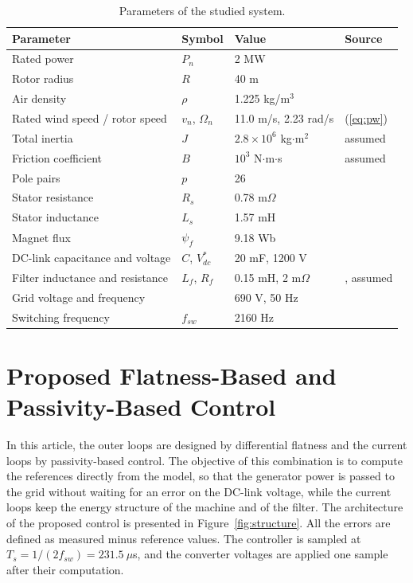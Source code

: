 \documentclass[11pt,a4paper]{article}
\begin{document}
\begin{table}[!htb]
\caption{Parameters of the studied system.}
\label{tab:param}
\centering
\begin{tabular}{llll}
\toprule
Parameter & Symbol & Value & Source\\
\midrule
Rated power & $P_n$ & 2 MW & \cite{hasan2021}\\
Rotor radius & $R$ & 40 m & \cite{rolan2009}\\
Air density & $\rho$ & 1.225 kg/m$^3$ & \cite{aimene2022}\\
Rated wind speed / rotor speed & $v_n$, $\Omega_n$ & 11.0 m/s, 2.23 rad/s & (\ref{eq:pw})\\
Total inertia & $J$ & $2.8\times10^6$ kg$\cdot$m$^2$ & assumed\\
Friction coefficient & $B$ & $10^3$ N$\cdot$m$\cdot$s & assumed\\
Pole pairs & $p$ & 26 & \cite{hasan2021}\\
Stator resistance & $R_s$ & 0.78 m$\Omega$ & \cite{hasan2021}\\
Stator inductance & $L_s$ & 1.57 mH & \cite{hasan2021}\\
Magnet flux & $\psi_f$ & 9.18 Wb & \cite{hasan2021}\\
DC-link capacitance and voltage & $C$, $V_{dc}^*$ & 20 mF, 1200 V & \cite{hasan2021}\\
Filter inductance and resistance & $L_f$, $R_f$ & 0.15 mH, 2 m$\Omega$ & \cite{hasan2021}, assumed\\
Grid voltage and frequency & & 690 V, 50 Hz & \cite{hasan2021}\\
Switching frequency & $f_{sw}$ & 2160 Hz & \cite{hasan2021}\\
\bottomrule
\end{tabular}
\end{table}

\section{Proposed Flatness-Based and Passivity-Based Control}
In this article, the outer loops are designed by differential flatness and the current loops by
passivity-based control. The objective of this combination is to compute the references directly from
the model, so that the generator power is passed to the grid without waiting for an error on the DC-link
voltage, while the current loops keep the energy structure of the machine and of the filter. The
architecture of the proposed control is presented in Figure~\ref{fig:structure}. All the errors are
defined as measured minus reference values. The controller is sampled at $T_s=1/(2f_{sw})=231.5~\mu$s,
and the converter voltages are applied one sample after their computation.
\end{document}
